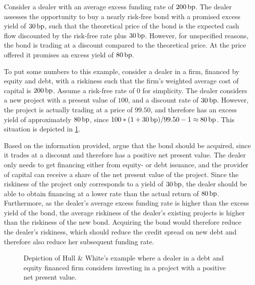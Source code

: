 \documentclass[main.tex]{subfiles}
\begin{document}
            \begin{example}
            Consider a dealer with an average excess funding rate of $200\,\text{bp}$. 
            The dealer assesses the opportunity to buy a nearly risk-free bond with a promised excess yield of $30\,\text{bp}$,
            such that the theoretical price of the bond is the expected cash flow 
            discounted by the risk-free rate plus $30\,\text{bp}$.
            However, for unspecified reasons, the bond is trading at a discount compared to the theoretical price.
            At the price offered it promises an excess yield of $80\,\text{bp}$.
            
            To put some numbers to this example,
            consider a dealer in a firm,
            financed by equity and debt, 
            with a riskiness such that the firm's weighted average cost of capital is $200\,\text{bp}$.
            Assume a risk-free rate of $0$ for simplicity.
            The dealer considers a new project with a present value of $100$,
            and a discount rate of $30\,\text{bp}$.
            However, the project is actually trading at a price of $99.50$,
            and therefore has an excess yield of approximately $80\,\text{bp}$,
            since $100*(1+30\,\text{bp}) / 99.50 - 1 \approx 80\,\text{bp}$.
            This situation is depicted in \cref{fig:hw-example}.

            Based on the information provided, \textcite{HullWhite2012FVA} argue that the bond should be acquired,
            since it trades at a discount and therefore has a positive net present value.
            The dealer only needs to get financing either from equity- or debt issuance,
            and the provider of capital can receive a share of the net present value of the project.
            Since the riskiness of the project only corresponds to a yield of $30\,\text{bp}$,
            the dealer should be able to obtain financing at a lower rate 
            than the actual return of $80\,\text{bp}$.
            Furthermore, as the dealer's average excess funding rate is higher than the excess yield of the bond, 
            the average riskiness of the dealer's existing projects is higher than the riskiness of the new bond.
            Acquiring the bond would therefore reduce the dealer's riskiness,
            which should reduce the credit spread on new debt and therefore also reduce her subsequent funding rate.
            \end{example}

            \begin{figure}
                \centering
                \caption{
                    Depiction of Hull \& White's example where a dealer in a debt and equity financed firm
                    considers investing in a project with a positive net present value.
                }
                \label{fig:hw-example}
            \end{figure}
            
\end{document}
